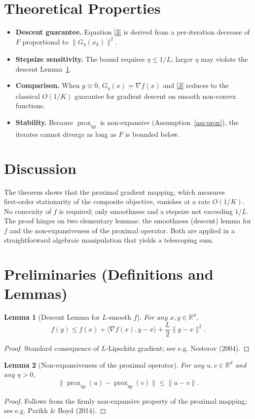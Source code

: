 \documentclass{article}
\newtheorem{lemma}{Lemma}
\newcommand{\prox}{\operatorname{prox}}
\newcommand{\grad}{\nabla}
\newcommand{\R}{\mathbb{R}}
\begin{document}
\section*{Theoretical Properties}
\begin{itemize}[leftmargin=*]
\item \textbf{Descent guarantee.} Equation \eqref{3} is derived from a per‑iteration decrease of $F$ proportional to $\|G_{\eta}(x_k)\|^{2}$.
\item \textbf{Stepsize sensitivity.} The bound requires $\eta\le1/L$; larger $\eta$ may violate the descent Lemma~\ref{lem:descent}.
\item \textbf{Comparison.} When $g\equiv0$, $G_{\eta}(x)=\grad f(x)$ and \eqref{3} reduces to the classical $O(1/K)$ guarantee for gradient descent on smooth non‑convex functions.
\item \textbf{Stability.} Because $\prox_{\eta g}$ is non‑expansive (Assumption~\ref{ass:prox}), the iterates cannot diverge as long as $F$ is bounded below.
\end{itemize}

\section*{Discussion}
The theorem shows that the proximal gradient mapping, which measures first‑order stationarity of the composite objective, vanishes at a rate $O(1/K)$. No convexity of $f$ is required; only smoothness and a stepsize not exceeding $1/L$. The proof hinges on two elementary lemmas: the smoothness (descent) lemma for $f$ and the non‑expansiveness of the proximal operator. Both are applied in a straightforward algebraic manipulation that yields a telescoping sum.

\newpage
\section*{Preliminaries (Definitions and Lemmas)}
\begin{lemma}[Descent Lemma for $L$‑smooth $f$]\label{lem:descent}
For any $x,y\in\R^{d}$,
\[
f(y)\le f(x)+\langle\grad f(x),y-x\rangle+\frac{L}{2}\|y-x\|^{2}.
\tag{4}
\]
\end{lemma}
\begin{proof}
Standard consequence of $L$‑Lipschitz gradient; see e.g. Nesterov (2004). \qedhere
\end{proof}

\begin{lemma}[Non‑expansiveness of the proximal operator]\label{lem:nonexp}
For any $u,v\in\R^{d}$ and any $\eta>0$,
\[
\bigl\|\prox_{\eta g}(u)-\prox_{\eta g}(v)\bigr\|
\le \|u-v\|.
\tag{5}
\]
\end{lemma}
\begin{proof}
Follows from the firmly non‑expansive property of the proximal mapping; see e.g. Parikh \& Boyd (2014). \qedhere
\end{proof}
\end{document}
